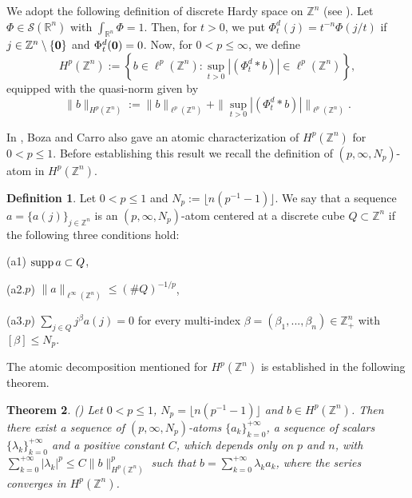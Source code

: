 \documentclass[leqno,12pt]{article} %
\newcommand\supp{\mathop{\rm supp}}
\theoremstyle{plain} %
\newtheorem{theorem}{\indent\sc Theorem}[section]
\theoremstyle{definition} %
\newtheorem{definition}[theorem]{\indent\sc Definition}
\begin{document}
We adopt the following definition of discrete Hardy space on $\mathbb{Z}^n$ (see \cite[Theorem 2.7]{Carro}). Let $\Phi \in \mathcal{S}(\mathbb{R}^n)$ with $\int_{\mathbb{R}^n} \Phi =1$. Then, for $t>0$, we put $\Phi_t^d(j) = t^{-n} \Phi(j/t)$ if $j \in \mathbb{Z}^n \setminus \{ {\bf 0} \}$ and $\Phi_t^d({\bf 0}) = 0$. Now, for $0 < p \leq \infty$, we define
\begin{equation} \label{discrete Hp}
H^p(\mathbb{Z}^n) := \left\{ b \in \ell^p(\mathbb{Z}^n) : \sup_{t>0} |(\Phi_t^d \ast b)| \in \ell^p(\mathbb{Z}^n) \right\},
\end{equation}
equipped with the quasi-norm given by
\begin{equation} \label{discrete norm}
\| b \|_{H^p(\mathbb{Z}^n)} := \| b \|_{\ell^p(\mathbb{Z}^n)} + \|\sup_{t>0} |(\Phi_t^d \ast b)| \|_{\ell^p(\mathbb{Z}^n)}.
\end{equation}

In \cite{Carro}, Boza and Carro also gave an atomic characterization of $H^p(\mathbb{Z}^n)$ for $0 < p \leq 1$. Before establishing this result we recall the definition of $(p, \infty, N_p)$-atom in $H^p(\mathbb{Z}^n)$. 

\begin{definition} Let $0 < p \leq 1$ and $N_p := \lfloor n(p^{-1} - 1) \rfloor$. We say that a sequence 
$a = \{ a(j) \}_{j \in \mathbb{Z}^n}$ is an $(p, \infty, N_p)$-atom centered at a discrete cube $Q \subset \mathbb{Z}^n$ if the following three conditions hold:

(a1) $\supp a \subset Q$,

(a2.$p$) $\| a \|_{\ell^\infty(\mathbb{Z}^n)} \leq (\# Q)^{-1/p}$,

(a3.$p$) $\displaystyle{\sum_{j \in Q}} j^{\beta} a(j) = 0$ for every multi-index $\beta=(\beta_1, ..., \beta_n) \in \mathbb{Z}_{+}^{n}$ with 
$[\beta] \leq N_p$.
\end{definition}

The atomic decomposition mentioned for $H^p(\mathbb{Z}^n)$ is established in the following theorem.

\begin{theorem} (\cite[Theorem 3.7]{Carro}) \label{atomic Hp} Let $0 < p \leq 1$, $N_p = \lfloor n (p^{-1} - 1) \rfloor$ and 
$b \in H^{p}(\mathbb{Z}^n)$. Then there exist a sequence of $(p, \infty, N_p)$-atoms $\{ a_k \}_{k=0}^{+\infty}$, a sequence of scalars 
$\{ \lambda_k \}_{k=0}^{+\infty}$ and a positive constant $C$, which depends only on $p$ and $n$, with 
$\sum_{k=0}^{+\infty} |\lambda_k |^{p} \leq C \| b \|_{H^{p}(\mathbb{Z}^n)}^{p}$ such that $b = \sum_{k=0}^{+\infty} \lambda_k a_k$, where the series converges in $H^{p}(\mathbb{Z}^n)$.
\end{theorem}
\end{document}
